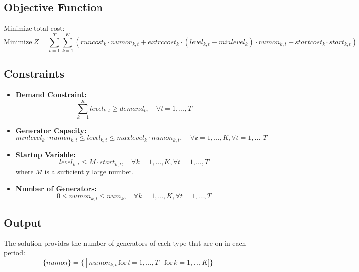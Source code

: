 \documentclass{article}
\begin{document}
\subsection*{Objective Function}
Minimize total cost:
\[
\text{Minimize } Z = \sum_{t=1}^{T} \sum_{k=1}^{K} \left( runcost_k \cdot numon_{k,t} + extracost_k \cdot (level_{k,t} - minlevel_k) \cdot numon_{k,t} + startcost_k \cdot start_{k,t} \right)
\]

\subsection*{Constraints}
\begin{itemize}
    \item \textbf{Demand Constraint:}
    \[
    \sum_{k=1}^{K} level_{k,t} \geq demand_t, \quad \forall t = 1, \ldots, T
    \]
    
    \item \textbf{Generator Capacity:}
    \[
    minlevel_k \cdot numon_{k,t} \leq level_{k,t} \leq maxlevel_k \cdot numon_{k,t}, \quad \forall k = 1, \ldots, K, \forall t = 1, \ldots, T
    \]

    \item \textbf{Startup Variable:}
    \[
    level_{k,t} \leq M \cdot start_{k,t}, \quad \forall k = 1, \ldots, K, \forall t = 1, \ldots, T
    \]
    where \( M \) is a sufficiently large number.

    \item \textbf{Number of Generators:}
    \[
    0 \leq numon_{k,t} \leq num_k, \quad \forall k = 1, \ldots, K, \forall t = 1, \ldots, T
    \]
\end{itemize}

\subsection*{Output}
The solution provides the number of generators of each type that are on in each period:
\[
\{ numon \} = \{ [numon_{k,t} \, \text{for} \, t = 1, \dots, T] \, \text{for} \, k = 1, \dots, K] \}
\]
\end{document}

